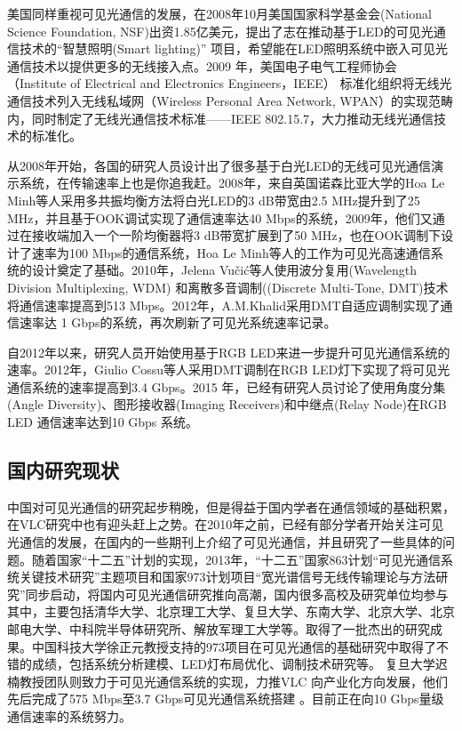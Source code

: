 美国同样重视可见光通信的发展，在2008年10月美国国家科学基金会(National Science Foundation, NSF)出资1.85亿美元，提出了志在推动基于LED的可见光通信技术的“智慧照明(Smart lighting)” 项目，希望能在LED照明系统中嵌入可见光通信技术以提供更多的无线接入点。2009 年，美国电子电气工程师协会（Institute of Electrical and Electronics Engineers，IEEE）
标准化组织将无线光通信技术列入无线私域网（Wireless Personal Area Network, WPAN）的实现范畴内，同时制定了无线光通信技术标准——IEEE 802.15.7，大力推动无线光通信技术的标准化。

从2008年开始，各国的研究人员设计出了很多基于白光LED的无线可见光通信演示系统，在传输速率上也是你追我赶。2008年，来自英国诺森比亚大学的Hoa Le Minh等人采用多共振均衡方法将白光LED的3 dB带宽由2.5 MHz提升到了25 MHz，并且基于OOK调试实现了通信速率达40 Mbps的系统\cite{minh2008high}，2009年，他们又通过在接收端加入一个一阶均衡器将3 dB带宽扩展到了50 MHz，也在OOK调制下设计了速率为100 Mbps的通信系统\cite{le2009100}，Hoa Le Minh等人的工作为可见光高速通信系统的设计奠定了基础。2010年，Jelena Vu{\v{c}}i{\'c}等人使用波分复用(Wavelength Division Multiplexing, WDM) 和离散多音调制((Discrete Multi-Tone, DMT)技术将通信速率提高到513 Mbps\cite{vuvcic2010513}。2012年，A.M.Khalid采用DMT自适应调制实现了通信速率达 1 Gbps的系统，再次刷新了可见光系统速率记录。

自2012年以来，研究人员开始使用基于RGB LED来进一步提升可见光通信系统的速率。2012年，Giulio Cossu等人采用DMT调制在RGB LED灯下实现了将可见光通信系统的速率提高到3.4 Gbps\cite{cossu20123}。2015 年，已经有研究人员讨论了使用角度分集(Angle Diversity)、图形接收器(Imaging Receivers)和中继点(Relay Node)在RGB LED 通信速率达到10 Gbps 系统\cite{hussein201510}。



\subsection{国内研究现状}
中国对可见光通信的研究起步稍晚，但是得益于国内学者在通信领域的基础积累，在VLC研究中也有迎头赶上之势。在2010年之前，已经有部分学者开始关注可见光通信的发展，在国内的一些期刊上介绍了可见光通信，并且研究了一些具体的问题\cite{丁德强2006可见光通信及其关键技术研究,于志刚2008白光,张立2010室内}。随着国家“十二五”计划的实现，2013年，“十二五”国家863计划“可见光通信系统关键技术研究”主题项目和国家973计划项目“宽光谱信号无线传输理论与方法研究”同步启动，将国内可见光通信研究推向高潮，国内很多高校及研究单位均参与其中，主要包括清华大学、北京理工大学、复旦大学、东南大学、北京大学、北京邮电大学、中科院半导体研究所、解放军理工大学等。取得了一批杰出的研究成果。中国科技大学徐正元教授支持的973项目在可见光通信的基础研究中取得了不错的成绩，包括系统分析建模、LED灯布局优化、调制技术研究等\cite{ma2012effects,zhang2012capacity,ma2012distributions}。 复旦大学迟楠教授团队则致力于可见光通信系统的实现，力推VLC 向产业化方向发展，他们先后完成了575 Mbps至3.7 Gbps可见光通信系统搭建
\cite{wang2013demonstration,wang2013875,chi2014ultra}。目前正在向10 Gbps量级通信速率的系统努力\cite{wang2014integrated}。

